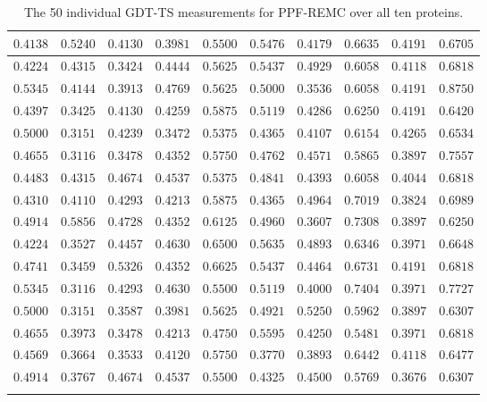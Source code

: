 \begin{longtable}{c|c|c|c|c|c|c|c|c|c}
$0.4138$ & $0.5240$ & $0.4130$ & $0.3981$ & $0.5500$ & $0.5476$ & $0.4179$ & $0.6635$ & $0.4191$ & $0.6705$ \\ \hline
$0.4224$ & $0.4315$ & $0.3424$ & $0.4444$ & $0.5625$ & $0.5437$ & $0.4929$ & $0.6058$ & $0.4118$ & $0.6818$ \\ \hline
$0.5345$ & $0.4144$ & $0.3913$ & $0.4769$ & $0.5625$ & $0.5000$ & $0.3536$ & $0.6058$ & $0.4191$ & $0.8750$ \\ \hline
$0.4397$ & $0.3425$ & $0.4130$ & $0.4259$ & $0.5875$ & $0.5119$ & $0.4286$ & $0.6250$ & $0.4191$ & $0.6420$ \\ \hline
$0.5000$ & $0.3151$ & $0.4239$ & $0.3472$ & $0.5375$ & $0.4365$ & $0.4107$ & $0.6154$ & $0.4265$ & $0.6534$ \\ \hline
$0.4655$ & $0.3116$ & $0.3478$ & $0.4352$ & $0.5750$ & $0.4762$ & $0.4571$ & $0.5865$ & $0.3897$ & $0.7557$ \\ \hline
$0.4483$ & $0.4315$ & $0.4674$ & $0.4537$ & $0.5375$ & $0.4841$ & $0.4393$ & $0.6058$ & $0.4044$ & $0.6818$ \\ \hline
$0.4310$ & $0.4110$ & $0.4293$ & $0.4213$ & $0.5875$ & $0.4365$ & $0.4964$ & $0.7019$ & $0.3824$ & $0.6989$ \\ \hline
$0.4914$ & $0.5856$ & $0.4728$ & $0.4352$ & $0.6125$ & $0.4960$ & $0.3607$ & $0.7308$ & $0.3897$ & $0.6250$ \\ \hline
$0.4224$ & $0.3527$ & $0.4457$ & $0.4630$ & $0.6500$ & $0.5635$ & $0.4893$ & $0.6346$ & $0.3971$ & $0.6648$ \\ \hline
$0.4741$ & $0.3459$ & $0.5326$ & $0.4352$ & $0.6625$ & $0.5437$ & $0.4464$ & $0.6731$ & $0.4191$ & $0.6818$ \\ \hline
$0.5345$ & $0.3116$ & $0.4293$ & $0.4630$ & $0.5500$ & $0.5119$ & $0.4000$ & $0.7404$ & $0.3971$ & $0.7727$ \\ \hline
$0.5000$ & $0.3151$ & $0.3587$ & $0.3981$ & $0.5625$ & $0.4921$ & $0.5250$ & $0.5962$ & $0.3897$ & $0.6307$ \\ \hline
$0.4655$ & $0.3973$ & $0.3478$ & $0.4213$ & $0.4750$ & $0.5595$ & $0.4250$ & $0.5481$ & $0.3971$ & $0.6818$ \\ \hline
$0.4569$ & $0.3664$ & $0.3533$ & $0.4120$ & $0.5750$ & $0.3770$ & $0.3893$ & $0.6442$ & $0.4118$ & $0.6477$ \\ \hline
$0.4914$ & $0.3767$ & $0.4674$ & $0.4537$ & $0.5500$ & $0.4325$ & $0.4500$ & $0.5769$ & $0.3676$ & $0.6307$ \\ \hline
\caption{The 50 individual GDT-TS measurements for PPF-REMC over all ten proteins.}
\end{longtable}
